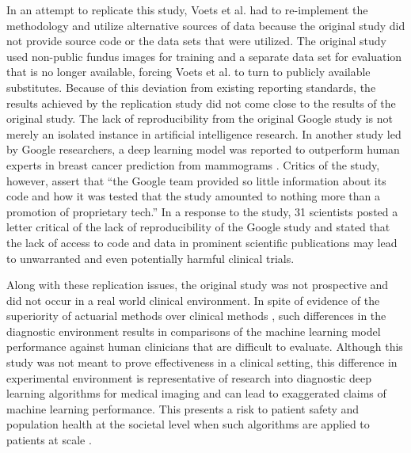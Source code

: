 \documentclass[12pt]{article}
\begin{document}
        In an attempt to replicate this study, Voets et al. \cite{replication} had to re-implement the methodology and utilize alternative sources of data because the original study did not provide source code or the data sets that were utilized. The original study used non-public fundus images for training and a separate data set for evaluation that is no longer available, forcing Voets et al. to turn to publicly available substitutes. Because of this deviation from existing reporting standards, the results achieved by the replication study did not come close to the results of the original study. The lack of reproducibility from the original Google study is not merely an isolated instance in artificial intelligence research. In another study led by Google researchers, a deep learning model was reported to outperform human experts in breast cancer prediction from mammograms \cite{breastCancer}. Critics of the study, however, assert that ``the Google team provided so little information about its code and how it was tested that the study amounted to nothing more than a promotion of proprietary tech.'' \cite{AIreplication} In a response to the study, 31 scientists posted a letter critical of the lack of reproducibility of the Google study and stated that the lack of access to code and data in prominent scientific publications may lead to unwarranted and even potentially harmful clinical trials. \cite{breastCancerCritique}
        
        Along with these replication issues, the  original study was not prospective and did not occur in a real world clinical environment. In spite of evidence of the superiority of actuarial methods over clinical methods \cite{actuarial}, such differences in the diagnostic environment results in comparisons of the machine learning model performance against human clinicians that are difficult to evaluate. Although this study was not meant to prove effectiveness in a clinical setting, this difference in experimental environment is representative of research into diagnostic deep learning algorithms for medical imaging and can lead to exaggerated claims of machine learning performance. This presents a risk to patient safety and population health at the societal level when such algorithms are applied to patients at scale \cite{AIvsClinicians}.

    
\end{document}
